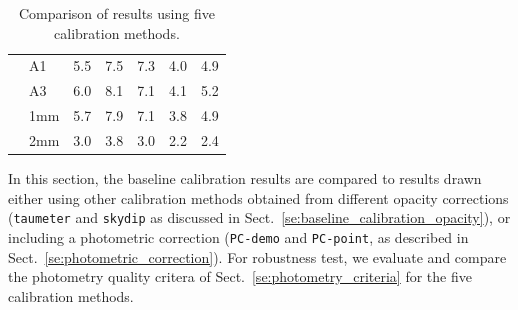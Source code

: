 \begin{table}[!htbp]
\begin{center}
\begin{tabular}{clrrrrr}
       &  A1            &   5.5    &    7.5   &    7.3    &    4.0    &  4.9 \\
       &  A3            &   6.0    &    8.1   &    7.1    &    4.1    &  5.2 \\
       &  1mm           &   5.7    &    7.9   &    7.1    &    3.8    &  4.9 \\
       &  2mm           &   3.0    &    3.8   &    3.0    &    2.2    &  2.4 \\
\hline
\end{tabular}
\caption[Comparison of calibration results using five
  methods]{Comparison of results using five calibration methods.}
\label{tab:Calibration_results_all}
\end{center}
\end{table}

In this section, the baseline calibration results are compared to
results drawn either using other calibration methods obtained from different
opacity corrections ({\tt taumeter} and {\tt skydip} as
discussed in Sect.~\ref{se:baseline_calibration_opacity}), or
including a photometric correction ({\tt PC-demo} and {\tt PC-point},
as described in Sect.~\ref{se:photometric_correction}). For robustness test, we
evaluate and compare the photometry quality critera of
Sect.~\ref{se:photometry_criteria} for the five calibration methods.


